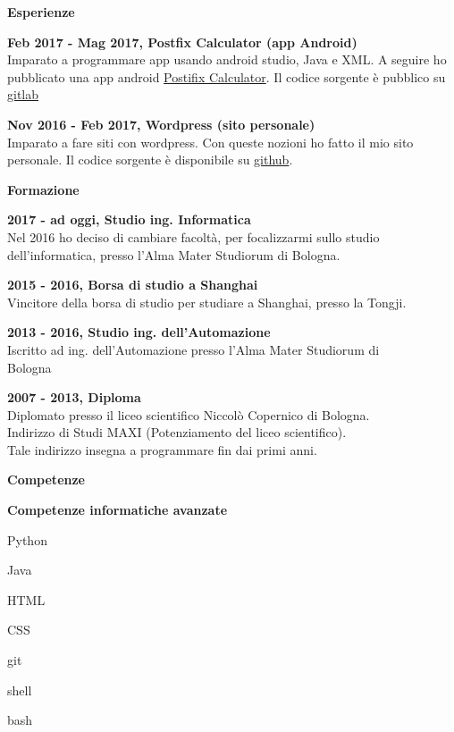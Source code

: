 \documentclass[a4paper,12pt,final]{memoir}
\newcommand{\Sep}{\vspace{1.5em}}
\newcommand{\SmallSep}{\vspace{0.5em}}
\newcommand{\CVSection}[1]
	{\Large\textbf{#1}\par
	\SmallSep\normalsize\normalfont}
\newcommand{\CVItem}[1]
	{\textbf{\color{RoyalBlue} #1}}
\begin{document}
\CVSection{Esperienze}
\CVItem{Feb 2017 - Mag 2017, Postfix Calculator (app Android)}\\
	Imparato a programmare app usando android studio, Java e XML. 
	A seguire ho pubblicato una app android \href{https://play.google.com/store/apps/details?id=postfixcalculator.mattiarubini.com.postfixcalculator}{ Postifix Calculator}.
	Il codice sorgente è pubblico su \href{https://gitlab.com/mattia.rubini/PostfixCalculator}{gitlab}
\SmallSep

\CVItem{Nov 2016 - Feb 2017, Wordpress (sito personale)}\\
	Imparato a fare siti con wordpress. 
	Con queste nozioni ho fatto il mio sito personale. Il codice sorgente è disponibile su \href{https://github.com/Mot93/MattiaRubini-com-wordpress-theme}{github}.
\Sep

\CVSection{Formazione}

\CVItem{2017 - ad oggi, Studio ing. Informatica}\\
	Nel 2016 ho deciso di cambiare facoltà, per focalizzarmi sullo studio dell'informatica, presso l'Alma Mater Studiorum di Bologna.
\SmallSep

\CVItem{2015 - 2016, Borsa di studio a Shanghai}\\
	Vincitore della borsa di studio per studiare a Shanghai, presso la Tongji.
\SmallSep

\CVItem{2013 - 2016, Studio ing. dell'Automazione}\\
	Iscritto ad ing. dell'Automazione presso l'Alma Mater Studiorum di\\Bologna
\SmallSep

\CVItem{2007 - 2013, Diploma}\\
	Diplomato presso il liceo scientifico Niccolò Copernico di Bologna.\\
	Indirizzo di Studi MAXI (Potenziamento del liceo scientifico).\\
	Tale indirizzo insegna a programmare fin dai primi anni. 
\Sep

\CVSection{Competenze}
\CVItem{Competenze informatiche avanzate}
\begin{multicols}{3}
\begin{compactitem}[\color{RoyalBlue}$\circ$]
	\item Python 
	\item Java
	\item HTML
	\item CSS
	\item git
	\item shell
	\item bash
\end{compactitem}
\end{multicols}
\SmallSep
\end{document}
